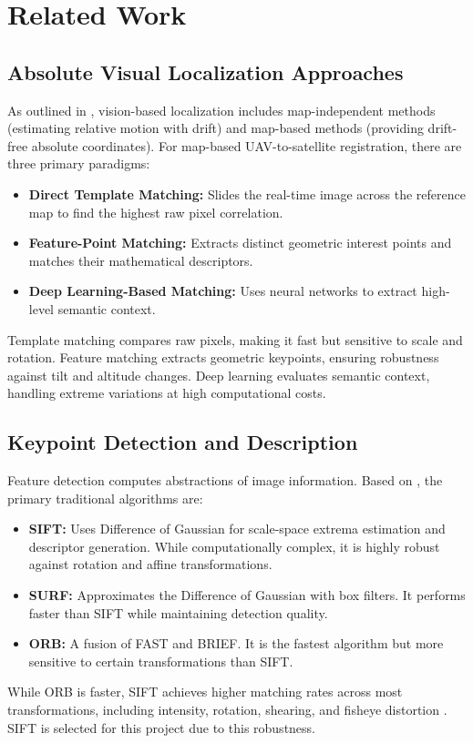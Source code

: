 \section{Related Work}

\subsection{Absolute Visual Localization Approaches}
As outlined in \cite{b1}, vision-based localization includes map-independent methods (estimating relative motion with drift) and map-based methods (providing drift-free absolute coordinates). For map-based UAV-to-satellite registration, there are three primary paradigms:

\begin{itemize}
    \item \textbf{Direct Template Matching:} Slides the real-time image across the reference map to find the highest raw pixel correlation.
    \item \textbf{Feature-Point Matching:} Extracts distinct geometric interest points and matches their mathematical descriptors.
    \item \textbf{Deep Learning-Based Matching:} Uses neural networks to extract high-level semantic context.
\end{itemize}

Template matching compares raw pixels, making it fast but sensitive to scale and rotation. Feature matching extracts geometric keypoints, ensuring robustness against tilt and altitude changes. Deep learning evaluates semantic context, handling extreme variations at high computational costs.

\subsection{Keypoint Detection and Description}
Feature detection computes abstractions of image information. Based on \cite{b2}, the primary traditional algorithms are:

\begin{itemize}
    \item \textbf{SIFT:} Uses Difference of Gaussian for scale-space extrema estimation and descriptor generation. While computationally complex, it is highly robust against rotation and affine transformations.
    \item \textbf{SURF:} Approximates the Difference of Gaussian with box filters. It performs faster than SIFT while maintaining detection quality.
    \item \textbf{ORB:} A fusion of FAST and BRIEF. It is the fastest algorithm but more sensitive to certain transformations than SIFT.
\end{itemize}

While ORB is faster, SIFT achieves higher matching rates across most transformations, including intensity, rotation, shearing, and fisheye distortion \cite{b2}. SIFT is selected for this project due to this robustness.
